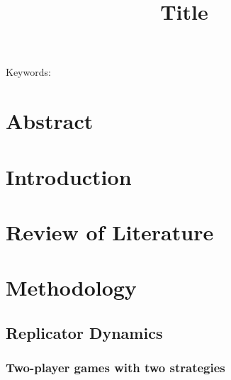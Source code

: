 \documentclass{article}
\title{\vspace*{-22mm}\bf Title}
\date{}
\begin{document}
\linenumbers
\maketitle




\noindent
Keywords: 


\tableofcontents
\section{Abstract}
\section{Introduction}
\section{Review of Literature}
\section{Methodology}
\subsection{Replicator Dynamics}

\subsubsection{Two-player games with two strategies}
\end{document}
